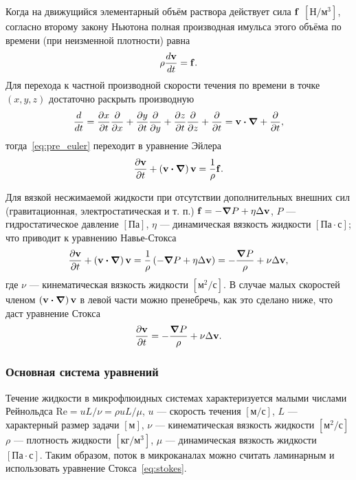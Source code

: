 \documentclass[oneside,final,12pt]{extreport}
\newcommand\bcdot[0]{\boldsymbol\cdot}
\newcommand\bnabla[0]{\boldsymbol\nabla}
\begin{document}
Когда на движущийся элементарный объём раствора действует сила
$\vb f$ $\left[\text{Н}/\text{м}^3\right]$,
согласно второму закону Ньютона полная производная имульса этого объёма по времени
(при неизменной плотности) равна
\begin{equation}
  \rho\frac{d \vb v}{d t} = \vb f.
\label{eq:pre_euler}
\end{equation}
Для перехода к частной производной скорости течения по времени в точке
$\left(x, y, z\right)$ достаточно раскрыть производную
\begin{equation}
  \frac{d}{dt} = \frac{\partial x}{\partial t}\frac{\partial}{\partial x} +
                 \frac{\partial y}{\partial t}\frac{\partial}{\partial y} +
                 \frac{\partial z}{\partial t}\frac{\partial}{\partial z} +
                 \frac{\partial}{\partial t}
               = \vb v \bcdot \bnabla + \frac{\partial}{\partial t},
\end{equation}
тогда~\eqref{eq:pre_euler} переходит в уравнение Эйлера
\begin{equation}
  \frac{\partial \vb v}{\partial t} + \left(\vb v \bcdot \bnabla\right) \vb v = \frac{1}{\rho} \vb f.
\label{eq:euler}
\end{equation}

Для вязкой несжимаемой жидкости при отсутствии дополнительных внешних сил
(гравитационная, электростатическая и т. п.)
$\vb f = - \grad P + \eta \Delta \vb v$,
$P$ --- гидростатическое давление $\left[\text{Па}\right]$,
$\eta$ --- динамическая вязкость жидкости $\left[\text{Па}\cdot\text{с}\right]$;
что приводит к уравнению Навье-Стокса\cite{bib:ll}
\begin{equation}
  \frac{\partial \vb v}{\partial t} + \left(\vb v \bcdot \bnabla\right) \vb v =
    \frac{1}{\rho}\left(-\grad P + \eta \Delta \vb v\right) =
    -\frac{\grad P}{\rho} + \nu \Delta \vb v,
\label{eq:navier-stokes}
\end{equation}
где $\nu$ --- кинематическая вязкость жидкости $\left[\text{м}^2/\text{с}\right]$.
В случае малых скоростей членом $\left(\vb v \bcdot \bnabla\right) \vb v$
в левой части можно пренебречь, как это сделано ниже, что даст уравнение Стокса
\begin{equation}
  \frac{\partial \vb v}{\partial t} = -\frac{\grad P}{\rho} + \nu \Delta \vb v.
\label{eq:stokes}
\end{equation}

\subsubsection*{Основная система уравнений}
Течение жидкости в микрофлюидных системах характеризуется малыми числами
Рейнольдса $\text{Re} = u L / \nu = \rho u L / \mu$,
$u$ --- скорость течения $\left[\text{м}/\text{с}\right]$,
$L$ --- характерный размер задачи $\left[\text{м}\right]$,
$\nu$ --- кинематическая вязкость жидкости $\left[\text{м}^2/\text{с}\right]$
$\rho$ --- плотность жидкости $\left[\text{кг}/\text{м}^3\right]$,
$\mu$ --- динамическая вязкость жидкости $\left[\text{Па}\cdot\text{с}\right]$.
Таким образом, поток в микроканалах можно считать ламинарным и использовать
уравнение Стокса~\eqref{eq:stokes}.
\end{document}
